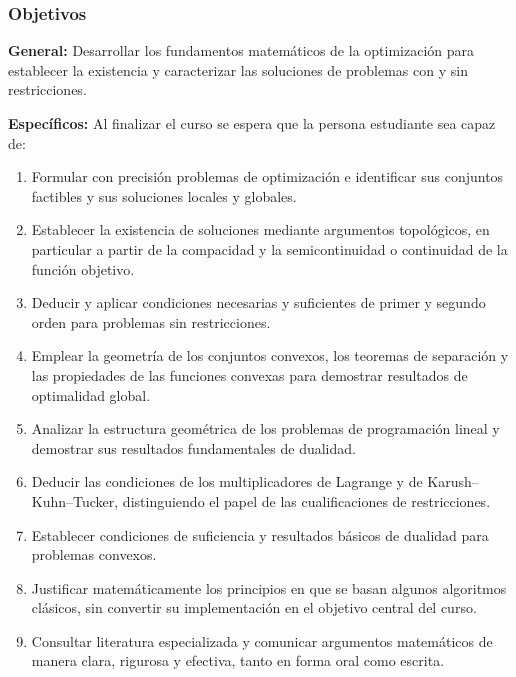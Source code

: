 \begin{refsection}
\subsubsection*{Objetivos}

\textbf{General:} Desarrollar los fundamentos matemáticos de la optimización para establecer la existencia y caracterizar las soluciones de problemas con y sin restricciones.

\textbf{Específicos:} Al finalizar el curso se espera que la persona estudiante sea capaz de:

\begin{enumerate}
\item Formular con precisión problemas de optimización e identificar sus conjuntos factibles y sus soluciones locales y globales.
\item Establecer la existencia de soluciones mediante argumentos topológicos, en particular a partir de la compacidad y la semicontinuidad o continuidad de la función objetivo.
\item Deducir y aplicar condiciones necesarias y suficientes de primer y segundo orden para problemas sin restricciones.
\item Emplear la geometría de los conjuntos convexos, los teoremas de separación y las propiedades de las funciones convexas para demostrar resultados de optimalidad global.
\item Analizar la estructura geométrica de los problemas de programación lineal y demostrar sus resultados fundamentales de dualidad.
\item Deducir las condiciones de los multiplicadores de Lagrange y de Karush--Kuhn--Tucker, distinguiendo el papel de las cualificaciones de restricciones.
\item Establecer condiciones de suficiencia y resultados básicos de dualidad para problemas convexos.
\item Justificar matemáticamente los principios en que se basan algunos algoritmos clásicos, sin convertir su implementación en el objetivo central del curso.
\item Consultar literatura especializada y comunicar argumentos matemáticos de manera clara, rigurosa y efectiva, tanto en forma oral como escrita.
\end{enumerate}


\end{refsection}
